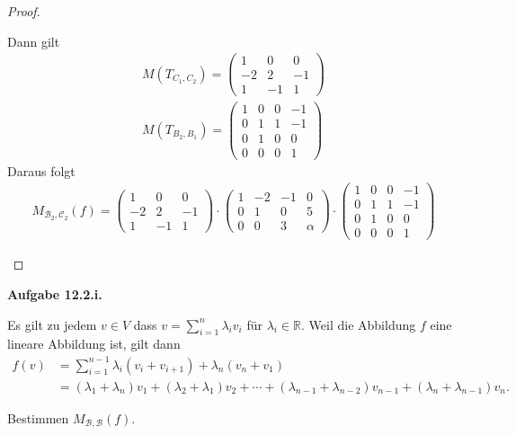 \documentclass[12pt]{extarticle}
\newcommand{\mg}[1]{\mathbb{#1}}
\newcommand{\mc}[1]{\mathcal{#1}}
\newcommand{\aufgn}[1]{\textbf{Aufgabe #1.}}
\begin{document}
\begin{proof}
\begin{itemize}
Dann gilt
\begin{align*}
  M(T_{C_1,C_2}) =
\begin{pmatrix}
  1 & 0 & 0 \\
  -2 & 2 & -1 \\
  1 & -1 & 1
\end{pmatrix}
 \\
  M(T_{B_2,B_1}) =
\begin{pmatrix}
  1 & 0 & 0 & -1 \\
  0 & 1 & 1 & -1 \\
  0 & 1 & 0 & 0 \\
  0 & 0 & 0 & 1
\end{pmatrix}
\end{align*}
Daraus folgt
\begin{align*}
  M_{\mc{B}_2,\mc{C}_2}(f) =
  \begin{pmatrix}
  1 & 0 & 0 \\
  -2 & 2 & -1 \\
  1 & -1 & 1
  \end{pmatrix}
  \cdot
\begin{pmatrix}
  1 & -2 & -1 & 0\\
  0 & 1 & 0 & 5 \\
  0 & 0 & 3 & \alpha
\end{pmatrix}
  \cdot
\begin{pmatrix}
  1 & 0 & 0 & -1 \\
  0 & 1 & 1 & -1 \\
  0 & 1 & 0 & 0 \\
  0 & 0 & 0 & 1
\end{pmatrix}
\end{align*}
\end{itemize}
\end{proof}

\newpage

\aufgn{12.2.i}

Es gilt zu jedem \(v \in V\) dass $v = \sum_{i =
  1}^n{\lambda_i v_i}$ für \(\lambda_i \in \mg{R}\).
Weil die Abbildung \(f\) eine lineare Abbildung ist, gilt
dann
\begin{align*}
  f(v)
  &= \sum_{i=1}^{n-1}{\lambda_i
    (v_i + v_{i+1}) + \lambda_n(v_n+v_1)} \\
  &= (\lambda_1 + \lambda_n) v_1 + (\lambda_2 +
    \lambda_1) v_2 + \cdots + (\lambda_{n-1} +
    \lambda_{n-2}) v_{n-1} +
    (\lambda_n + \lambda_{n-1})v_n.
\end{align*}

Bestimmen \(M_{\mc{B},\mc{B}}(f)\).
\end{document}

